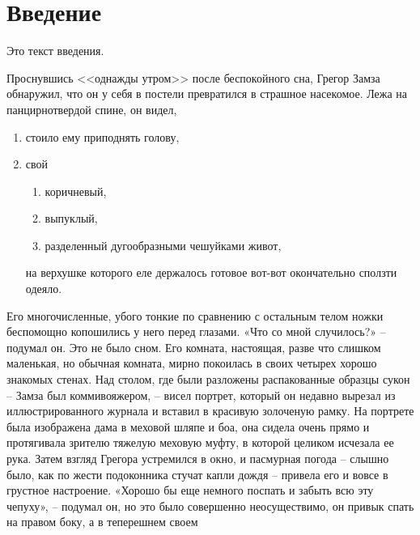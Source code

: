 
\newcommand{\No}{\textnumero}







\maketitle

\tableofcontents

\section*{Введение}
Это текст введения.

Проснувшись <<однажды утром>> после беспокойного сна, Грегор Замза обнаружил, что он у себя в постели превратился в страшное насекомое. 
Лежа на панцирнотвердой спине, он видел,

\begin{enumerate}
   \item стоило ему приподнять голову, 
   \item свой 
   \begin{enumerate}
      \item коричневый, 
      \item выпуклый, 
      \item разделенный дугообразными чешуйками живот, 
   \end{enumerate}
   
   на верхушке которого еле держалось готовое вот-вот окончательно сползти одеяло. 
   
\end{enumerate}

Его многочисленные, убого тонкие по сравнению с остальным телом ножки беспомощно копошились у него перед глазами. «Что со мной случилось?» – подумал он. Это не было сном. Его комната, настоящая, разве что слишком маленькая, но обычная комната, мирно покоилась в своих четырех хорошо знакомых стенах. Над столом, где были разложены распакованные образцы сукон – Замза был коммивояжером, – висел портрет, который он недавно вырезал из иллюстрированного журнала и вставил в красивую золоченую рамку. На портрете была изображена дама в меховой шляпе и боа, она сидела очень прямо и протягивала зрителю тяжелую меховую муфту, в которой целиком исчезала ее рука. Затем взгляд Грегора устремился в окно, и пасмурная погода – слышно было, как по жести подоконника стучат капли дождя – привела его и вовсе в грустное настроение. «Хорошо бы еще немного поспать и забыть всю эту чепуху», – подумал он, но это было совершенно неосуществимо, он привык спать на правом боку, а в теперешнем своем





